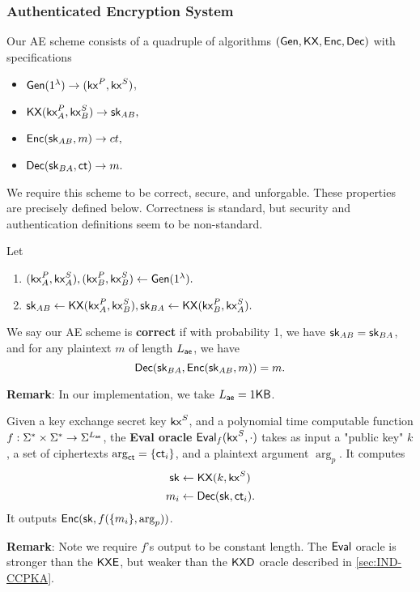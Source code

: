 \subsubsection{Authenticated Encryption System}
\label{subsec:AE}
Our AE scheme consists of a quadruple of algorithms $(\mathsf{Gen}, \mathsf{KX}, \mathsf{Enc}, \mathsf{Dec})$ with specifications
\begin{itemize}
    \item $\mathsf{Gen}(1^{\lambda}) \to (\mathsf{kx}^P, \mathsf{kx}^S)$,
    \item $\mathsf{KX}(\mathsf{kx}_A^P, \mathsf{kx}_B^S) \to {\ensuremath{\mathsf{sk}}}_{AB},$
    \item $\mathsf{Enc}({\mathsf{sk}}_{AB}, m) \to ct,$
    \item $\mathsf{Dec}({\mathsf{sk}}_{BA}, \mathsf{ct}) \to m.$
\end{itemize}
We require this scheme to be correct, secure, and unforgable. These properties are precisely defined below. Correctness is standard, but security and authentication definitions seem to be non-standard.
\begin{definition}
\label{defn:AE-correctness}
Let
\begin{enumerate}
    \item $(\mathsf{kx}^P_A, \mathsf{kx}_A^S), (\mathsf{kx}^P_B, \mathsf{kx}_B^S)  \leftarrow \mathsf{Gen}(1^{\lambda}).$
    \item ${\mathsf{sk}}_{AB} \leftarrow \mathsf{KX}(\mathsf{kx}_A^P,\mathsf{kx}_B^S), {\mathsf{sk}}_{BA} \leftarrow \mathsf{KX}(\mathsf{kx}_B^P, \mathsf{kx}_A^S).$
\end{enumerate}
We say our AE scheme is \textbf{correct} if with probability 1, we have ${\mathsf{sk}}_{AB} = {\mathsf{sk}}_{BA}$, and for any plaintext $m$ of length $L_{\mathsf{ae}}$, we have
$$\mathsf{Dec}({\mathsf{sk}}_{BA}, \mathsf{Enc}({\mathsf{sk}}_{AB}, m)) = m.$$
\end{definition}
\textbf{Remark}: In our implementation, we take $L_{\mathsf{ae}} = 1 \mathsf{KB}$.
\begin{definition}
\label{defn:AE-eval-oracle}
Given a key exchange secret key $\mathsf{kx}^S$, and a polynomial time computable function $f: \Sigma^* \times \Sigma^* \to \Sigma^{L_{\mathsf{ae}}}$, the \textbf{Eval oracle} $\mathsf{Eval}_{f}(\mathsf{kx}^S, \cdot)$ takes as input a "public key" $k$, a set of ciphertexts $\arg_{\mathsf{ct}} = \{\mathsf{ct}_i\}$, and a plaintext argument $\arg_{p}$. It computes 
$${\mathsf{sk}} \leftarrow \mathsf{KX}(k, \mathsf{kx}^S)$$
$$m_i \leftarrow \mathsf{Dec}({\mathsf{sk}}, \mathsf{ct}_i).$$ 
It outputs $\mathsf{Enc}({\mathsf{sk}}, f(\{m_i\}, \arg_p))$.
\end{definition}
\textbf{Remark}: Note we require $f$'s output to be constant length. The $\mathsf{Eval}$ oracle is stronger than the $\mathsf{KXE}$, but weaker than the $\mathsf{KXD}$ oracle described in \cref{sec:IND-CCPKA}.
